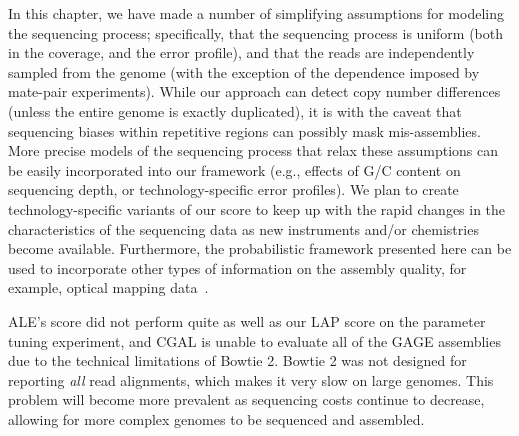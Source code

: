 \documentclass[12pt,\mydriver]{thesis}
\begin{document}
In this chapter, we have made a number of simplifying assumptions for
modeling the sequencing process; specifically, that the sequencing
process is uniform (both in the coverage, and the error profile), and that the
reads are independently sampled from the genome (with the exception of
the dependence imposed by mate-pair experiments).
While our approach can detect copy number differences (unless the entire genome is exactly duplicated), it is with the caveat that sequencing biases within repetitive regions can possibly mask mis-assemblies.
More precise models
of the sequencing process that relax these assumptions can be easily
incorporated into our framework (e.g., effects of G/C content on
sequencing depth, or technology-specific error profiles). We plan
to create technology-specific variants of our score to keep up with the rapid changes in the characteristics of the sequencing data as new instruments and/or chemistries become available.
Furthermore, the probabilistic framework presented here can be used to
incorporate other types of information on the assembly quality,
for example, optical mapping data~\cite{zhou2007validation}.


ALE's score did not perform quite as well as our LAP score on the parameter tuning experiment, and
CGAL is unable to evaluate all of the GAGE assemblies due to the technical limitations of Bowtie 2.
Bowtie 2 was not designed for reporting \emph{all} read alignments, which makes it very slow on large genomes. This problem will become more prevalent as sequencing costs continue to decrease, allowing for more complex genomes to be sequenced and assembled.
\end{document}
